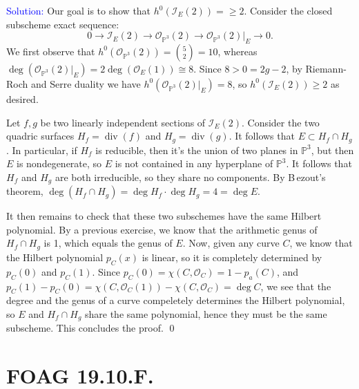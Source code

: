 \documentclass[11pt]{article}
\newcommand{\PP}{\mathbb{P}}
\newcommand{\cI}{\mathcal{I}}
\newcommand{\cO}{\mathcal{O}}
\newcommand{\Div}{\operatorname{div}}
\newenvironment{solution}{\begin{trivlist}\item[]{\textcolor{blue}{Solution:}}}{\qed \end{trivlist}}
\begin{document}
\begin{solution}
	Our goal is to show that $h^0(\cI_E(2)) = \geq 2$. Consider the closed subscheme exact sequence:
	\[
		0 \longrightarrow \cI_E(2) \longrightarrow \cO_{\PP^3}(2) \longrightarrow \cO_{\PP^3}(2)|_E \longrightarrow 0.
	\]
	We first observe that $h^0(\cO_{\PP^3}(2)) = \binom{5}{2} = 10$, whereas $\deg(\cO_{\PP^3}(2)|_E) = 2 \deg(\cO_E(1)) \cong 8$. Since $8 > 0 = 2g-2$, by Riemann-Roch and Serre duality we have $h^0(\cO_{\PP^3}(2)|_E) = 8$, so $h^0(\cI_E(2)) \geq 2$ as desired. 

	Let $f, g$ be two linearly independent sections of $\cI_E(2)$. Consider the two quadric surfaces $H_f = \Div(f)$ and $H_g = \Div(g)$. It follows that $E \subset H_f \cap H_g$. In particular, if $H_f$ is reducible, then it's the union of two planes in $\PP^3$, but then $E$ is nondegenerate, so $E$ is not contained in any hyperplane of $\PP^3$. It follows that $H_f$ and $H_g$ are both irreducible, so they share no components. By B\,ezout's theorem, $\deg(H_f \cap H_g) = \deg H_f \cdot \deg H_g = 4 = \deg E$. 

	It then remains to check that these two subschemes have the same Hilbert polynomial. By a previous exercise, we know that the arithmetic genus of $H_f \cap H_g$ is 1, which equals the genus of $E$. Now, given any curve $C$, we know that the Hilbert polynomial $p_C(x)$ is linear, so it is completely determined by $p_C(0)$ and $p_C(1)$. Since $p_C(0) = \chi(C, \cO_C) = 1 - p_a(C)$, and $p_C(1) - p_C(0) = \chi(C, \cO_C(1)) - \chi(C, \cO_C) = \deg C$, we see that the degree and the genus of a curve compeletely determines the Hilbert polynomial, so $E$ and $H_f \cap H_g$ share the same polynomial, hence they must be the same subscheme. This concludes the proof. 
\end{solution}

\newpage

\section*{FOAG 19.10.F.}
\end{document}
